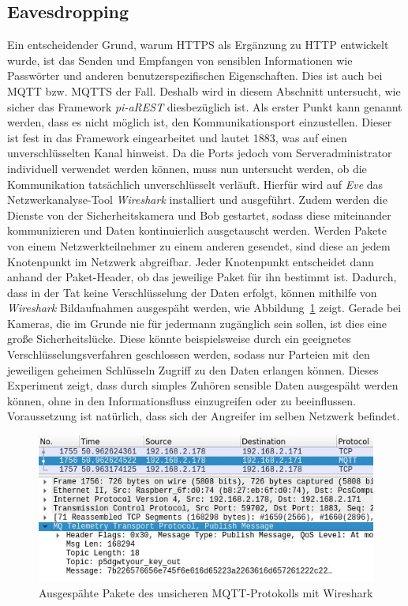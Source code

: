 \subsection{Eavesdropping}
Ein entscheidender Grund, warum HTTPS als Ergänzung zu HTTP entwickelt wurde,
ist das Senden und Empfangen von sensiblen Informationen wie Passwörter und
anderen benutzerspezifischen Eigenschaften. Dies ist auch bei MQTT bzw. MQTTS
der Fall. Deshalb wird in diesem Abschnitt untersucht, wie sicher das Framework
\textit{pi-aREST} diesbezüglich ist. Als erster Punkt kann genannt werden, dass
es nicht möglich ist, den Kommunikationsport einzustellen. Dieser ist fest in
das Framework eingearbeitet und lautet 1883, was auf einen unverschlüsselten
Kanal hinweist. Da die Ports jedoch vom Serveradministrator individuell
verwendet werden können, muss nun untersucht werden, ob die Kommunikation
tatsächlich unverschlüsselt verläuft. Hierfür wird auf \textit{Eve} das
Netzwerkanalyse-Tool \textit{Wireshark} installiert und ausgeführt. Zudem werden
die Dienste von der Sicherheitskamera und Bob gestartet, sodass diese
miteinander kommunizieren und Daten kontinuierlich ausgetauscht werden. Werden
Pakete von einem Netzwerkteilnehmer zu einem anderen gesendet, sind diese an
jedem Knotenpunkt im Netzwerk abgreifbar. Jeder Knotenpunkt entscheidet dann
anhand der Paket-Header, ob das jeweilige Paket für ihn bestimmt ist. Dadurch,
dass in der Tat keine Verschlüsselung der Daten erfolgt, können mithilfe von
\textit{Wireshark} Bildaufnahmen ausgespäht werden, wie
Abbildung~\ref{fig:wireshark} zeigt. Gerade bei Kameras, die im Grunde nie für
jedermann zugänglich sein sollen, ist dies eine große Sicherheitslücke. Diese
könnte beispielsweise durch ein geeignetes Verschlüsselungsverfahren geschlossen
werden, sodass nur Parteien mit den jeweiligen geheimen Schlüsseln Zugriff zu
den Daten erlangen können. Dieses Experiment zeigt, dass durch simples Zuhören
sensible Daten ausgespäht werden können, ohne in den Informationsfluss
einzugreifen oder zu beeinflussen. Voraussetzung ist natürlich, dass sich der
Angreifer im selben Netzwerk befindet.

\begin{figure}
  \centerline{\includegraphics[width=\columnwidth]{images/wireshark}}
  \caption{Ausgespähte Pakete des unsicheren MQTT-Protokolls mit Wireshark}
  \label{fig:wireshark}
\end{figure}

